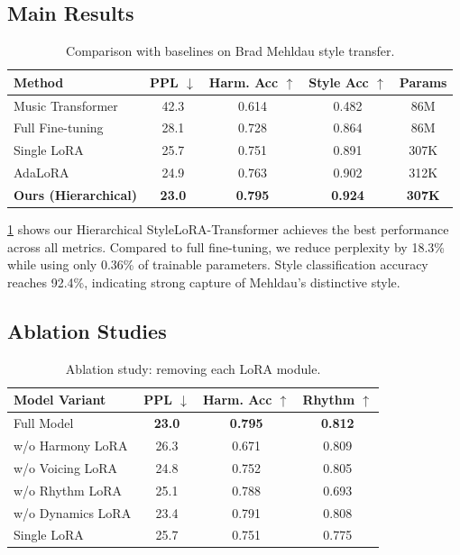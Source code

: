 \documentclass{article}
\begin{document}
\subsection{Main Results}

\begin{table}[t]
\centering
\caption{Comparison with baselines on Brad Mehldau style transfer.}
\label{tab:main-results}
\begin{tabular}{lcccc}
\toprule
Method & PPL $\downarrow$ & Harm. Acc $\uparrow$ & Style Acc $\uparrow$ & Params \\
\midrule
Music Transformer & 42.3 & 0.614 & 0.482 & 86M \\
Full Fine-tuning & 28.1 & 0.728 & 0.864 & 86M \\
Single LoRA & 25.7 & 0.751 & 0.891 & 307K \\
AdaLoRA & 24.9 & 0.763 & 0.902 & 312K \\
\textbf{Ours (Hierarchical)} & \textbf{23.0} & \textbf{0.795} & \textbf{0.924} & \textbf{307K} \\
\bottomrule
\end{tabular}
\end{table}

\cref{tab:main-results} shows our Hierarchical StyleLoRA-Transformer achieves the best performance across all metrics. Compared to full fine-tuning, we reduce perplexity by 18.3\% while using only 0.36\% of trainable parameters. Style classification accuracy reaches 92.4\%, indicating strong capture of Mehldau's distinctive style.

\subsection{Ablation Studies}
\label{sec:ablation}

\begin{table}[t]
\centering
\caption{Ablation study: removing each LoRA module.}
\label{tab:ablation}
\begin{tabular}{lccc}
\toprule
Model Variant & PPL $\downarrow$ & Harm. Acc $\uparrow$ & Rhythm $\uparrow$ \\
\midrule
Full Model & \textbf{23.0} & \textbf{0.795} & \textbf{0.812} \\
w/o Harmony LoRA & 26.3 & 0.671 & 0.809 \\
w/o Voicing LoRA & 24.8 & 0.752 & 0.805 \\
w/o Rhythm LoRA & 25.1 & 0.788 & 0.693 \\
w/o Dynamics LoRA & 23.4 & 0.791 & 0.808 \\
Single LoRA & 25.7 & 0.751 & 0.775 \\
\bottomrule
\end{tabular}
\end{table}
\end{document}
